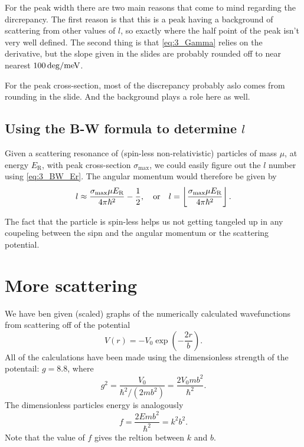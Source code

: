 \documentclass[11pt,letter, swedish, english
]{article}
\begin{document}
For the
peak width there are two main reasons that come to mind regarding the
dircrepancy. The first reason is that this is a peak having a
background of scattering from other values of $l$, so exactly where
the half point of the peak isn't very well defined. The second thing
is that \eqref{eq:3_Gamma} relies on the derivative, but the slope
given in the slides are probably rounded off to near nearest
$\unit[100]{deg/meV}$. 

For the peak cross-section, most of the discrepancy probably aslo
comes from rounding in the slide. And the background plays a role here
as well. 

\subsection{Using the B-W formula to determine $l$}
\newcommand{\ER}{E_{\text{R}}}
Given a scattering resonance of (spin-less non-relativistic) particles
of mass $\mu$, at energy $\ER$, with peak cross-section $\sigma_{\max}$, we could
easily figure out the $l$ number using \eqref{eq:3_BW_Er}. The angular
momentum would therefore be given by
\begin{equation}
l\approx\frac{\sigma_{\max} \mu \ER}{4\pi\hbar^2} - \frac{1}{2}
\qcomma\text{or}\quad
l=\left\lfloor\frac{\sigma_{\max} \mu \ER}{4\pi\hbar^2}\right\rfloor.
\end{equation}

The fact that the particle is spin-less helps us not getting tangeled
up in any coupeling between the sipn and the angular momentum or the
scattering potential.






\section{More scattering}
We have ben given (scaled) graphs of the numerically calculated
wavefunctions from scattering off of the potential
\begin{equation}
V(r)=-V_0\exp(-\frac{2r}{b}).
\end{equation}
All of the calculations have been made using the dimensionless
strength of the potentail: $g=8.8$, where
\begin{equation}
g^2=\frac{V_0}{\hbar^2/(2mb^2)}
=\frac{2V_0 mb^2}{\hbar^2}.
\end{equation}
The dimensionless particles energy is analogously 
\begin{equation}
f=\frac{2Emb^2}{\hbar^2}=k^2b^2.
\end{equation}
Note that the value of $f$ gives the reltion between $k$ and $b$.
\end{document}

